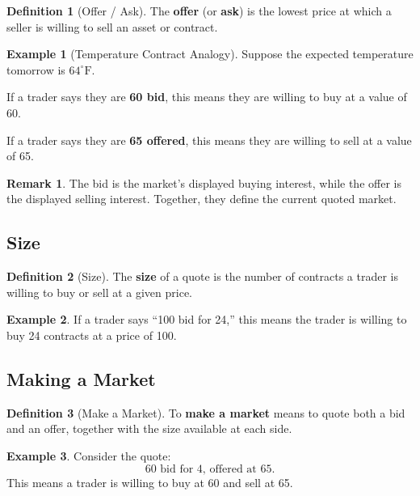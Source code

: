 \documentclass[11pt]{article}
\theoremstyle{definition}
\newtheorem{definition}{Definition}[section]
\newtheorem{example}{Example}[section]
\newtheorem{remark}{Remark}[section]
\begin{document}
\begin{definition}[Offer / Ask]
The \textbf{offer} (or \textbf{ask}) is the lowest price at which a seller is willing to sell an asset or contract.
\end{definition}

\begin{example}[Temperature Contract Analogy]
Suppose the expected temperature tomorrow is $64^\circ\mathrm{F}$.

If a trader says they are \textbf{60 bid}, this means they are willing to buy at a value of 60.

If a trader says they are \textbf{65 offered}, this means they are willing to sell at a value of 65.
\end{example}

\begin{remark}
The bid is the market's displayed buying interest, while the offer is the displayed selling interest. Together, they define the current quoted market.
\end{remark}

\subsection{Size}

\begin{definition}[Size]
The \textbf{size} of a quote is the number of contracts a trader is willing to buy or sell at a given price.
\end{definition}

\begin{example}
If a trader says ``100 bid for 24,'' this means the trader is willing to buy 24 contracts at a price of 100.
\end{example}

\subsection{Making a Market}

\begin{definition}[Make a Market]
To \textbf{make a market} means to quote both a bid and an offer, together with the size available at each side.
\end{definition}

\begin{example}
Consider the quote:
\[
\text{60 bid for 4, offered at 65.}
\]
This means a trader is willing to buy at 60 and sell at 65.
\end{example}
\end{document}
